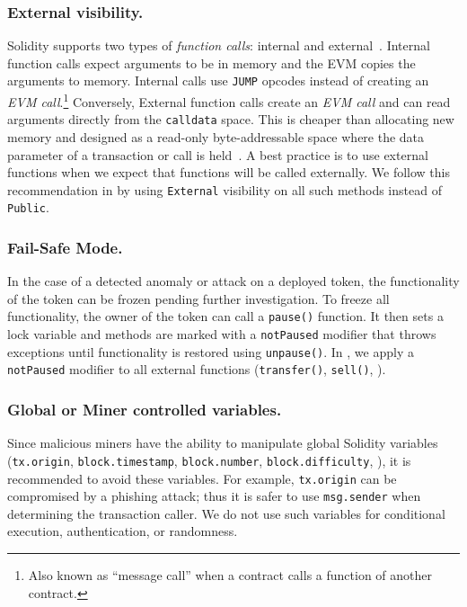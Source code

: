 \subsubsection{External visibility.}

Solidity supports two types of \textit{function calls}: internal and external~\cite{SolidityDoc}. Internal function calls expect arguments to be in memory and the EVM copies the arguments to memory. Internal calls use \texttt{JUMP} opcodes instead of creating an \textit{EVM call}.\footnote{Also known as ``message call'' when a contract calls a function of another contract.} Conversely, External function calls create an \textit{EVM call} and can read arguments directly from the \texttt{calldata} space. This is cheaper than allocating new memory and designed as a read-only byte-addressable space where the data parameter of a transaction or call is held~\cite{EthInDepth}. A best practice is to use external functions when we expect that functions will be called externally. We follow this recommendation in \sys by using \texttt{External} visibility on all such methods instead of \texttt{Public}. 

\subsubsection{Fail-Safe Mode.}

In the case of a detected anomaly or attack on a deployed \erc token, the functionality of the token can be frozen pending further investigation. To freeze all functionality, the owner of the token can call a \texttt{pause()} function. It then sets a lock variable and methods are marked with a \texttt{notPaused} modifier that throws exceptions until functionality is restored using \texttt{unpause()}. In \sys, we apply a \texttt{notPaused} modifier to all external functions (\eg \texttt{transfer()}, \texttt{sell()}, \etc).

\subsubsection{Global or Miner controlled variables.}

Since malicious miners have the ability to manipulate global Solidity variables (\eg \texttt{tx.origin}, \texttt{block.timestamp}, \texttt{block.number}, \texttt{block.difficulty}, \etc), it is recommended to avoid these variables. For example, \texttt{tx.origin} can be compromised by a phishing attack; thus it is safer to use \texttt{msg.sender} when determining the transaction caller. We do not use such variables for conditional execution, authentication, or randomness.

